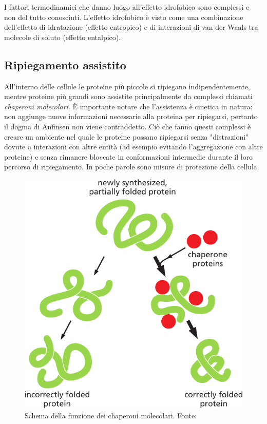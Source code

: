 {{\par I fattori termodinamici che danno luogo all’effetto idrofobico sono complessi e non del tutto conosciuti. L’effetto idrofobico è visto come una combinazione dell’effetto di idratazione (effetto entropico) e di interazioni di van der Waals tra molecole di soluto (effetto entalpico).

}
	
\subsection{Ripiegamento assistito}
All'interno delle cellule le proteine più piccole si ripiegano indipendentemente, mentre proteine più grandi sono assistite principalmente da complessi chiamati \textit{chaperoni molecolari}. È  importante notare che l'assistenza è cinetica in natura: non aggiunge nuove informazioni necessarie alla proteina per ripiegarsi, pertanto il dogma di Anfinsen non viene contraddetto. Ciò che fanno questi complessi è creare un ambiente nel quale le proteine possano ripiegarsi senza "distrazioni" dovute a interazioni con altre entità (ad esempio evitando l'aggregazione con altre proteine) e senza rimanere bloccate in conformazioni intermedie durante il loro percorso di ripiegamento. In poche parole sono misure di protezione della cellula. 

\begin{figure}[h]
	\centering
	\includegraphics[scale=0.4]{images/chaperone-alberts.png}
	\caption{Schema della funzione dei chaperoni molecolari. Fonte: \cite{alberts2018essential}}
	\label{fig:chaperoni}
\end{figure}

}
